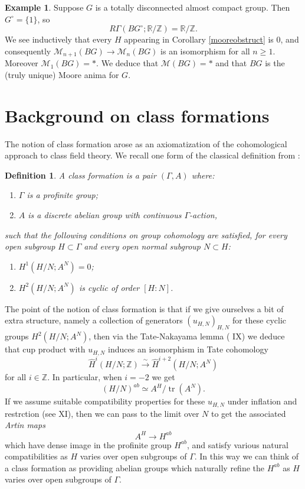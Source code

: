 \documentclass[12pt]{article}
\newtheorem{definition}[theorem]{Definition}
\theoremstyle{definition}
\newtheorem{example}[theorem]{Example}
\newcommand{\on}{\operatorname}
\newcommand{\mc}{\mathcal}
\newcommand{\mbb}{\mathbb}
\newcommand{\wh}{\widehat}
\begin{document}
\begin{example}\label{tdmoore}
Suppose $G$ is a totally disconnected almost compact group.  Then $G^\circ=\{1\}$, so
$$R\Gamma(BG^\circ;\mbb{R}/\mbb{Z})=\mbb{R}/\mbb{Z}.$$
We see inductively that every $H$ appearing in Corollary \ref{mooreobstruct} is $0$, and consequently $\mc{M}_{n+1}(BG)\to\mc{M}_n(BG)$ is an isomorphism for all $n\geq 1$.  Moreover $\mc{M}_1(BG)=\ast$.  We deduce that $\mc{M}(BG)=\ast$ and that $BG$ is the (truly unique) Moore anima for $G$.
\end{example}

\section{Background on class formations}\label{cfsection}

The notion of class formation arose as an axiomatization of the cohomological approach to class field theory.  We recall one form of the classical definition from \cite{artintate}:

\begin{definition}\label{cfprofgp}
A \emph{class formation} is a pair $(\Gamma,A)$ where:
\begin{enumerate}
\item $\Gamma$ is a profinite group;

\item $A$ is a discrete abelian group with continuous $\Gamma$-action,
\end{enumerate}
such that the following conditions on group cohomology are satisfied, for every open subgroup $H\subset \Gamma$ and every open normal subgroup $N\subset H$:
\begin{enumerate}
\item $H^1(H/N;A^N)=0$;
\item $H^2(H/N;A^N)$ is cyclic of order $[H:N]$.
\end{enumerate}
\end{definition}


The point of the notion of class formation is that if we give ourselves a bit of extra structure, namely a collection of generators $(u_{H,N})_{H,N}$ for these cyclic groups $H^2(H/N;A^N)$, then via the Tate-Nakayama lemma (\cite{corpslocaux} IX) we deduce that cup product with $u_{H,N}$ induces an isomorphism in Tate cohomology
$$\widehat{H}^i(H/N;\mbb{Z})\overset{\sim}{\rightarrow} \wh{H}^{i+2}(H/N;A^N)$$
for all $i\in\mbb{Z}$.  In particular, when $i=-2$ we get
$$(H/N)^{ab}\simeq A^H/\on{tr}(A^N).$$
If we assume suitable compatibility properties for these $u_{H,N}$ under inflation and restrction (see \cite{corpslocaux} XI), then we can pass to the limit over $N$ to get the associated \emph{Artin maps}
$$A^H \to H^{ab}$$
which have dense image in the profinite group $H^{ab}$, and satisfy various natural compatibilities as $H$ varies over open subgroups of $\Gamma$.  In this way we can think of a class formation as providing abelian groups which naturally refine the $H^{ab}$ as $H$ varies over open subgroups of $\Gamma$.
\end{document}
